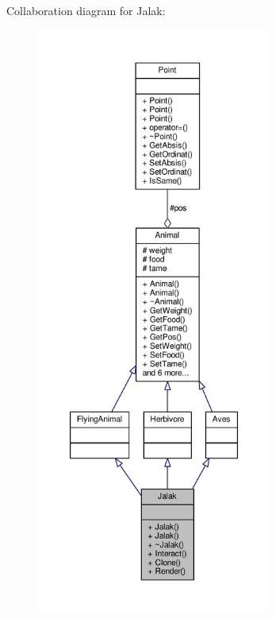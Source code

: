 Collaboration diagram for Jalak\+:
\nopagebreak
\begin{figure}[H]
\begin{center}
\leavevmode
\includegraphics[height=550pt]{classJalak__coll__graph}
\end{center}
\end{figure}
